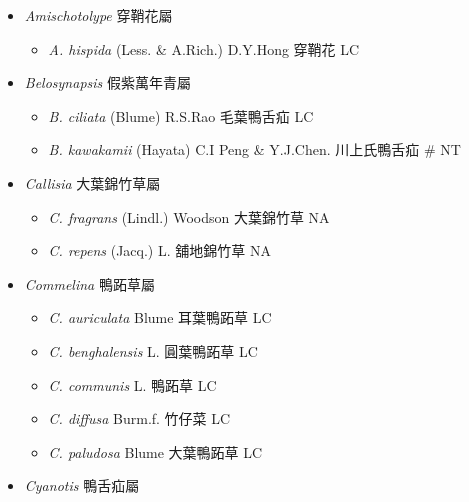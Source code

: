 
  \begin{itemize}
 \item[] \textit{Amischotolype} 穿鞘花屬
                                
  \begin{itemize}
        \item[] \textit{A. hispida} (Less. \& A.Rich.) D.Y.Hong  穿鞘花   LC
  \end{itemize}
 \item[] \textit{Belosynapsis} 假紫萬年青屬
                                
  \begin{itemize}
        \item[] \textit{B. ciliata} (Blume) R.S.Rao  毛葉鴨舌疝   LC
        \item[] \textit{B. kawakamii} (Hayata) C.I Peng \& Y.J.Chen.  川上氏鴨舌疝  \# NT
  \end{itemize}
 \item[] \textit{Callisia} 大葉錦竹草屬
                                
  \begin{itemize}
        \item[] \textit{C. fragrans} (Lindl.) Woodson  大葉錦竹草   NA
        \item[] \textit{C. repens} (Jacq.) L.  舖地錦竹草   NA
  \end{itemize}
 \item[] \textit{Commelina} 鴨跖草屬
                                
  \begin{itemize}
        \item[] \textit{C. auriculata} Blume  耳葉鴨跖草   LC
        \item[] \textit{C. benghalensis} L.  圓葉鴨跖草   LC
        \item[] \textit{C. communis} L.  鴨跖草   LC
        \item[] \textit{C. diffusa} Burm.f.  竹仔菜   LC
        \item[] \textit{C. paludosa} Blume  大葉鴨跖草   LC
  \end{itemize}
 \item[] \textit{Cyanotis} 鴨舌疝屬
                                

\end{itemize}
